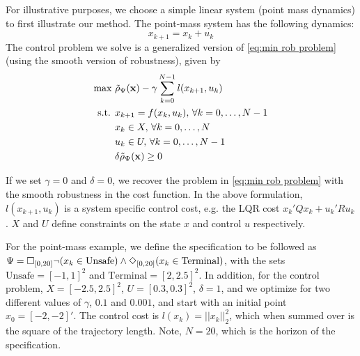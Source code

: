 For illustrative purposes, we choose a simple linear system (point mass dynamics) to first illustrate our method. The point-mass system has the following dynamics:
\begin{equation}
\label{eq:PointMass}
x_{k+1} = x_k + u_k
\end{equation}
The control problem we solve is a generalized version of \eqref{eq:min rob problem} (using the smooth version of robustness), given by
\begin{subequations}
\label{eq:general_ctrl}
\begin{align}
\text{max } & \tilde{\rho}_{\Psi}(\mathbf{x}) - \gamma \sum_{k=0}^{N-1} l(x_{k+1},u_{k}) \\
\text{s.t. } & x_{k+1} = f(x_k,u_k), \, \forall k=0,\dotsc,N-1 \\
 & x_k \in X, \, \forall k=0,\dotsc,N \\
 & u_k \in U, \, \forall k=0,\dotsc,N-1 \\
 & \delta \tilde{\rho}_{\Psi}(\mathbf{x}) \geq 0
\end{align}
\end{subequations}

If we set $\gamma=0$ and $\delta=0$, we recover the problem in \eqref{eq:min rob problem} with the smooth robustness in the cost function. In the above formulation, $l(x_{k+1},u_{k})$ is a system specific control cost, e.g. the LQR cost $x_k'Qx_k + u_k'Ru_k$. $X$ and $U$ define constraints on the state $x$ and control $u$ respectively. 

For the point-mass example, we define the specification to be followed as $\Psi = \square_{[0,20]} \neg (x_k \in \text{Unsafe}) \wedge \Diamond_{[0,20]} (x_k \in \text{Terminal})$, with the sets $\text{Unsafe}=[-1,1]^2$ and $\text{Terminal}=[2,2.5]^2$. In addition, for the control problem, $X=[-2.5,2.5]^2$, $U=[0.3,0.3]^2$, $\delta=1$, and we optimize for two different values of $\gamma$, $0.1$ and $0.001$, and start with an initial point $x_0=[-2,-2]'$. The control cost is $l(x_k) = ||x_k||_{2}^2$, which when summed over is the square of the trajectory length. Note, $N=20$, which is the horizon of the specification.


